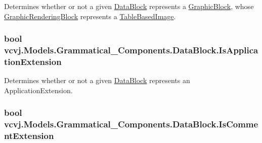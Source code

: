 Determines whether or not a given \hyperlink{classvcvj_1_1_models_1_1_grammatical___components_1_1_data_block}{Data\+Block} represents a \hyperlink{classvcvj_1_1_models_1_1_grammatical___components_1_1_graphic_block}{Graphic\+Block}, whose \hyperlink{classvcvj_1_1_models_1_1_grammatical___components_1_1_graphic_rendering_block}{Graphic\+Rendering\+Block} represents a \hyperlink{classvcvj_1_1_models_1_1_grammatical___components_1_1_table_based_image}{Table\+Based\+Image}. 

\subsubsection[{\texorpdfstring{Is\+Application\+Extension}{IsApplicationExtension}}]{\setlength{\rightskip}{0pt plus 5cm}bool vcvj.\+Models.\+Grammatical\+\_\+\+Components.\+Data\+Block.\+Is\+Application\+Extension\hspace{0.3cm}{\ttfamily [get]}}\hypertarget{classvcvj_1_1_models_1_1_grammatical___components_1_1_data_block_a9bb735c2e7aa8254611cd6f0dd5af1f0}{}\label{classvcvj_1_1_models_1_1_grammatical___components_1_1_data_block_a9bb735c2e7aa8254611cd6f0dd5af1f0}


Determines whether or not a given \hyperlink{classvcvj_1_1_models_1_1_grammatical___components_1_1_data_block}{Data\+Block} represents an Application\+Extension. 

\subsubsection[{\texorpdfstring{Is\+Comment\+Extension}{IsCommentExtension}}]{\setlength{\rightskip}{0pt plus 5cm}bool vcvj.\+Models.\+Grammatical\+\_\+\+Components.\+Data\+Block.\+Is\+Comment\+Extension\hspace{0.3cm}{\ttfamily [get]}}\hypertarget{classvcvj_1_1_models_1_1_grammatical___components_1_1_data_block_ad690c1a03593faeda687f872b4fa1752}{}\label{classvcvj_1_1_models_1_1_grammatical___components_1_1_data_block_ad690c1a03593faeda687f872b4fa1752}


